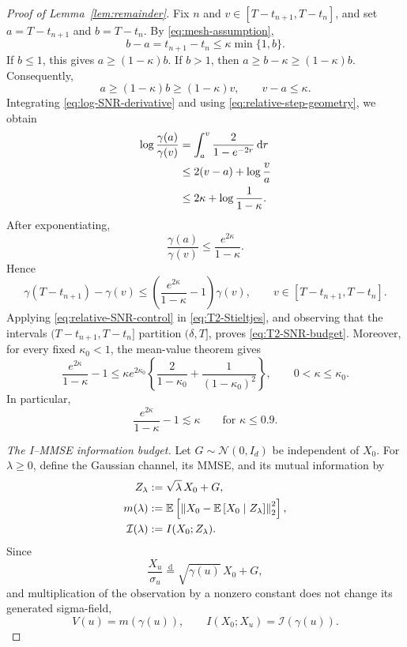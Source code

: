 \documentclass[11pt]{article}
\theoremstyle{definition}
\newcommand{\E}{\mathbb{E}}
\newcommand{\N}{\mathcal{N}}
\newcommand{\Id}{I_d}
\newcommand{\norm}[1]{\left\lVert #1\right\rVert_2}
\newcommand{\dd}{\,\mathrm{d}}
\begin{document}
\begin{proof}[Proof of Lemma~\ref{lem:remainder}]
Fix $n$ and $v\in[T-t_{n+1},T-t_n]$, and set
$a=T-t_{n+1}$ and $b=T-t_n$. By \eqref{eq:mesh-assumption},
\[
    b-a=t_{n+1}-t_n\le\kappa\min\{1,b\}.
\]
If $b\le1$, this gives $a\ge(1-\kappa)b$. If $b>1$, then
$a\ge b-\kappa\ge(1-\kappa)b$. Consequently,
\begin{equation}
    a\ge(1-\kappa)b\ge(1-\kappa)v,
    \qquad
    v-a\le\kappa.
    \label{eq:relative-step-geometry}
\end{equation}
Integrating \eqref{eq:log-SNR-derivative} and using
\eqref{eq:relative-step-geometry}, we obtain
\begin{align}
    \log\frac{\gamma(a)}{\gamma(v)}
    &=
    \int_a^v\frac{2}{1-e^{-2r}}\dd r
    \notag\\
    &\le
    2(v-a)+\log\frac{v}{a}
    \notag\\
    &\le
    2\kappa+\log\frac{1}{1-\kappa}.
    \label{eq:SNR-log-ratio}
\end{align}
After exponentiating,
\[
    \frac{\gamma(a)}{\gamma(v)}
    \le\frac{e^{2\kappa}}{1-\kappa}.
\]
Hence
\begin{equation}
    \gamma(T-t_{n+1})-\gamma(v)
    \le
    \left(\frac{e^{2\kappa}}{1-\kappa}-1\right)\gamma(v),
    \qquad v\in[T-t_{n+1},T-t_n].
    \label{eq:relative-SNR-control}
\end{equation}
Applying \eqref{eq:relative-SNR-control} in
\eqref{eq:T2-Stieltjes}, and observing that the intervals
$(T-t_{n+1},T-t_n]$ partition $(\delta,T]$, proves
\eqref{eq:T2-SNR-budget}. Moreover, for every fixed
$\kappa_0<1$, the mean-value theorem gives
\begin{equation}
    \frac{e^{2\kappa}}{1-\kappa}-1
    \le
    \kappa e^{2\kappa_0}
    \left\{
       \frac{2}{1-\kappa_0}
       +\frac{1}{(1-\kappa_0)^2}
    \right\},
    \qquad 0<\kappa\le\kappa_0.
    \label{eq:relative-mesh-linear}
\end{equation}
In particular,
\[
    \frac{e^{2\kappa}}{1-\kappa}-1
    \lesssim\kappa
    \qquad\text{for }\kappa\le0.9.
\]

\medskip\noindent\emph{The I--MMSE information budget.}
Let $G\sim\N(0,\Id)$ be independent of $X_0$. For $\lambda\ge0$,
define the Gaussian channel, its MMSE, and its mutual information by
\begin{align}
    Z_\lambda&:=\sqrt{\lambda}\,X_0+G,\notag\\
    m(\lambda)
    &:=
    \E\left[
       \norm{
          X_0-\E\left[X_0\mid Z_\lambda\right]
       }^2
    \right],\notag\\
    \mathcal I(\lambda)&:=I(X_0;Z_\lambda).
\label{eq:Gaussian-channel-defs}
\end{align}
Since
\[
    \frac{X_u}{\sigma_u}
    \overset{\mathrm d}=
    \sqrt{\gamma(u)}\,X_0+G,
\]
and multiplication of the observation by a nonzero constant does not
change its generated sigma-field,
\begin{equation}
    V(u)=m(\gamma(u)),
    \qquad
    I(X_0;X_u)=\mathcal I(\gamma(u)).
    \label{eq:OU-channel-identification}
\end{equation}


\end{proof}
\end{document}
